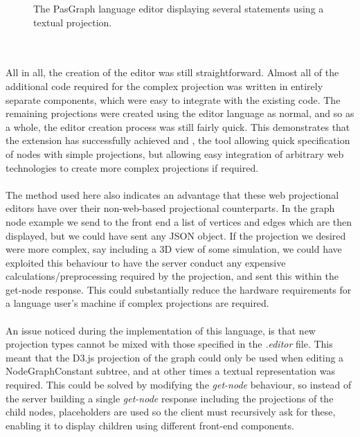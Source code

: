 \documentclass{article}
\begin{document}
{\begin{figure}[h!]
  \caption{The PasGraph language editor displaying several statements using a textual projection.}
  \label{fig:pasgraphUI1}
\end{figure}
\\
\\
All in all, the creation of the editor was still straightforward. Almost all of the additional code required for the complex projection was written in entirely separate components, which were easy to integrate with the existing code. The remaining projections were created using the editor language as normal, and so as a whole, the editor creation process was still fairly quick. This demonstrates that the extension has successfully achieved \RSetup and \RCustom, the tool allowing quick specification of nodes with simple projections, but allowing easy integration of arbitrary web technologies to create more complex projections if required. 
\\
\\
The method used here also indicates an advantage that these web projectional editors have over their non-web-based projectional counterparts. In the graph node example we send to the front end a list of vertices and edges which are then displayed, but we could have sent any JSON object. If the projection we desired were more complex, say including a 3D view of some simulation, we could have exploited this behaviour to have the server conduct any expensive calculations/preprocessing required by the projection, and sent this within the get-node response. This could substantially reduce the hardware requirements for a language user's machine if complex projections are required.
\\
\\
An issue noticed during the implementation of this language, is that new projection types cannot be mixed with those specified in the \emph{.editor} file. This meant that the D3.js projection of the graph could only be used when editing a NodeGraphConstant subtree, and at other times a textual representation was required. This could be solved by modifying the \emph{get-node} behaviour, so instead of the server building a single \emph{get-node} response including the projections of the child nodes, placeholders are used so the client must recursively ask for these, enabling it to display children using different front-end components.
%
%
}
\end{document}
